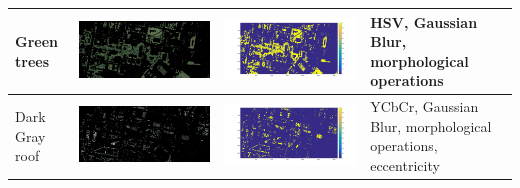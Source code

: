 \documentclass[fleqn,10pt]{SelfArx} %
\begin{document}
\begin{table}
\begin{tabular}{>{\centering\arraybackslash}M{8mm}cc>{\centering\arraybackslash}M{20mm}}
Green trees & \includegraphics[clip,scale=0.07]{20rgb.jpg} & \includegraphics[trim={6cm 2.5cm 4.5cm 1.6cm},clip,scale=0.18]{20.jpg} & \vspace{-3cm}HSV, Gaussian Blur, morphological operations \\ 
\midrule 
\vspace{-3cm}
\hspace{-0.3cm}
Dark Gray roof & \includegraphics[clip,scale=0.07]{21rgb.jpg} & \includegraphics[trim={6cm 2.5cm 4.5cm 1.6cm},clip,scale=0.18]{21.jpg} & \vspace{-3cm}YCbCr, Gaussian Blur, morphological operations, eccentricity \\ 

\end{tabular}
\end{table}
\end{document}
